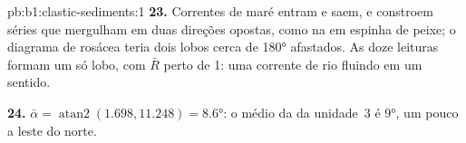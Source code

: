 \begin{solution}{pb:b1:clastic-sediments:1}
\textbf{23.} Correntes de maré entram e saem, e constroem séries que mergulham em duas
direções opostas, como na  em espinha de peixe; o diagrama de
rosácea teria dois lobos cerca de \ang{180} afastados. As doze leituras formam um só
lobo, com $\bar R$ perto de 1: uma corrente de rio fluindo em um sentido.

\textbf{24.} $\bar\alpha = \operatorname{atan2}(1.698, 11.248) = \ang{8.6}$: o 
médio da  da unidade~3 é \ang{9}, um pouco a leste do norte.
\end{solution}
